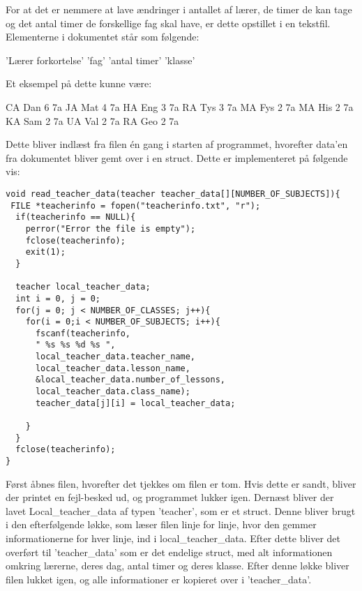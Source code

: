 For at det er nemmere at lave ændringer i antallet af lærer, de timer de kan tage og det antal timer de forskellige fag skal have, er dette opstillet i en tekstfil. 
Elementerne i dokumentet står som følgende:

’Lærer forkortelse’ ’fag’ ’antal timer’ ’klasse’

Et eksempel på dette kunne være:

    CA Dan 6 7a
    JA Mat 4 7a
    HA Eng 3 7a
    RA Tys 3 7a
    MA Fys 2 7a
    MA His 2 7a
    KA Sam 2 7a
    UA Val 2 7a
    RA Geo 2 7a

Dette bliver indlæst fra filen én gang i starten af programmet, hvorefter data’en fra dokumentet bliver gemt over i en struct.
Dette er implementeret på følgende vis:

\begin{lstlisting}
void read_teacher_data(teacher teacher_data[][NUMBER_OF_SUBJECTS]){
 FILE *teacherinfo = fopen("teacherinfo.txt", "r");
  if(teacherinfo == NULL){
    perror("Error the file is empty");
    fclose(teacherinfo);
    exit(1);
  }

  teacher local_teacher_data;
  int i = 0, j = 0;
  for(j = 0; j < NUMBER_OF_CLASSES; j++){
    for(i = 0;i < NUMBER_OF_SUBJECTS; i++){
      fscanf(teacherinfo,
      " %s %s %d %s ",
      local_teacher_data.teacher_name, 
      local_teacher_data.lesson_name, 
      &local_teacher_data.number_of_lessons, 
      local_teacher_data.class_name);
      teacher_data[j][i] = local_teacher_data; 
  
    } 
  }  
  fclose(teacherinfo);
}
\end{lstlisting}

Først åbnes filen, hvorefter det tjekkes om filen er tom. Hvis dette er sandt, bliver der printet en fejl-besked ud, og programmet lukker igen.
Dernæst bliver der lavet Local\_teacher\_data af typen ’teacher’, som er et struct. Denne bliver brugt i den efterfølgende løkke, som læser filen linje for linje, hvor den gemmer informationerne for hver linje, ind i local\_teacher\_data. Efter dette bliver det overført til ’teacher\_data’ som er det endelige struct, med alt informationen omkring lærerne, deres dag, antal timer og deres klasse. 
Efter denne løkke bliver filen lukket igen, og alle informationer er kopieret over i ’teacher\_data’.